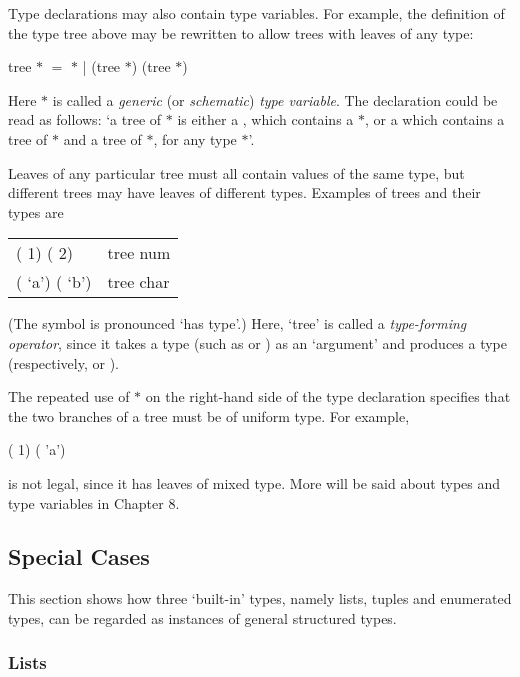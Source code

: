 Type declarations may also contain type variables. For example, the definition of the type tree above may be rewritten to allow trees with leaves of any type:
\begin{mlcoded}
    tree $*$ \hastype$=$  $*$ |  (tree $*$) (tree $*$)
\end{mlcoded}
Here $*$ is called a \textit{generic} (or \textit{schematic}) \textit{type variable}. The declaration could be read as follows: `a tree of $*$ is either a , which contains a $*$, or a  which contains a tree of $*$ and a tree of $*$, for any type $*$'.

Leaves of any particular tree must all contain values of the same type, but different trees may have leaves of different types. Examples of trees and their types are
\begin{mlcoded}
    \begin{tabular}{ll}

    \ml{BRANCH} (\ml{LEAF} 1) (\ml{LEAF} 2)
    &\hastype tree num\\
    \ml{BRANCH} (\ml{LEAF} `a') (\ml{LEAF} `b')
    &\hastype tree char

    \end{tabular}
\end{mlcoded}
(The symbol \hastype{} is pronounced `has type'.) Here, `tree' is called a \textit{type-forming operator}, since it takes a type (such as  or ) as an `argument' and produces a type (respectively,  or ).

The repeated use of $*$ on the right-hand side of the type declaration specifies that the two branches of a tree must be of uniform type. For example,
\begin{mlcoded}
     ( 1) ( 'a')
\end{mlcoded}
is not legal, since it has leaves of mixed type. More will be said about types and type variables in Chapter 8.

\subsection{Special Cases}

This section shows how three `built-in' types, namely lists, tuples and enumerated types, can be regarded as instances of general structured types.

\subsubsection{Lists}

